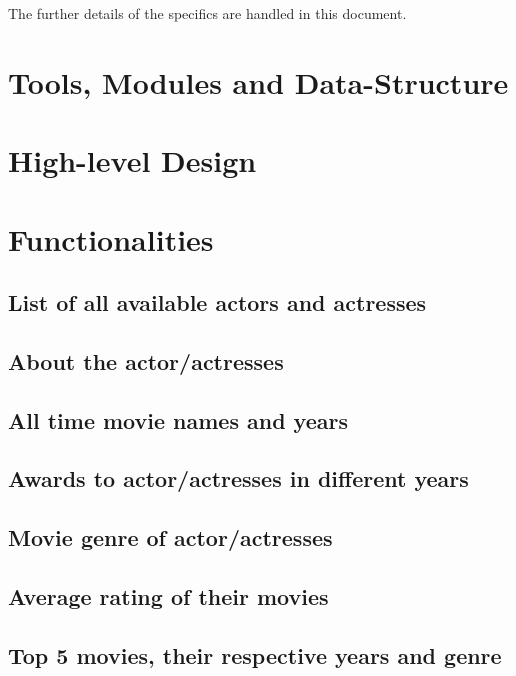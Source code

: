 \documentclass[12pt]{article}
\begin{document}
The further details of the specifics are handled in this document.

\section{Tools, Modules and Data-Structure}

\section{High-level Design}

\section{Functionalities}
\subsection{List of all available actors and actresses} \label{list-actors}

\subsection{About the actor/actresses} \label{about}

\subsection{All time movie names and years} \label{movies}

\subsection{Awards to actor/actresses in different years} \label{awards}

\subsection{Movie genre of actor/actresses} \label{genre}

\subsection{Average rating of their movies} \label{average-rating}

\subsection{Top 5 movies, their respective years and genre} \label{top-movies}
\end{document}
